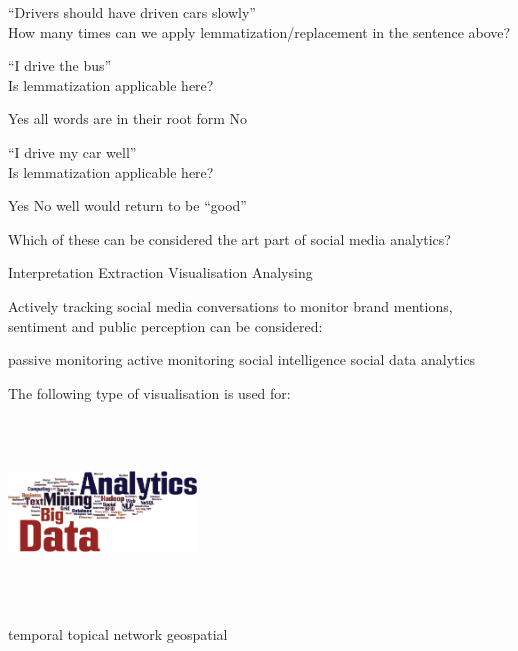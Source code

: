 \documentclass[theme=sleek, randomorder, hidesidemenu]{webquiz}
\begin{document}
\begin{question}
  ``Drivers should have driven cars slowly''\\
  How many times can we apply lemmatization/replacement in the sentence above?\\
\end{question}

\begin{question}
  ``I drive the bus''\\
  Is lemmatization applicable here?
  \begin{choice}
    \incorrect Yes \feedback all words are in their root form
    \correct No
  \end{choice}
\end{question}

\begin{question}
  ``I drive my car well''\\
  Is lemmatization applicable here?

  \begin{choice}
    \correct Yes
    \incorrect No \feedback well would return to be ``good''
  \end{choice}
\end{question}

\begin{question}
  Which of these can be considered the art part of social media analytics?
  \begin{choice}[columns=2]
    \correct Interpretation
    \incorrect Extraction
    \incorrect Visualisation
    \incorrect Analysing
  \end{choice}
\end{question}

\begin{question}
  Actively tracking social media conversations to monitor brand mentions, sentiment and public perception can be considered:
  \begin{choice}[columns=2]
    \incorrect passive monitoring
    \correct active monitoring
    \incorrect social intelligence
    \incorrect social data analytics
  \end{choice}
\end{question}

\begin{question}
  The following type of visualisation is used for:
  \begin{center}
    \includegraphics[height=50mm, width=50mm]{sma-quiz-1.png}
  \end{center}
  \begin{choice}
    \incorrect temporal
    \correct topical
    \incorrect network
    \incorrect geospatial
  \end{choice}
\end{question}
\end{document}
